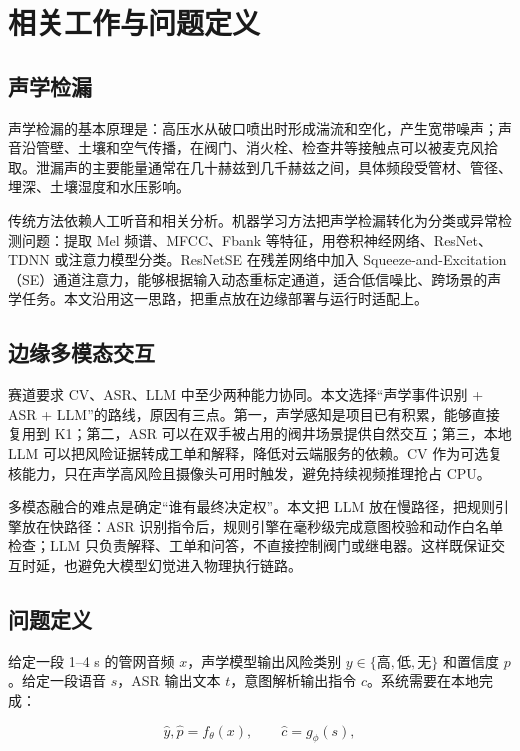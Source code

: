 \documentclass[UTF8,11pt,a4paper,fontset=none]{ctexart}
\begin{document}
\section{相关工作与问题定义}
\label{sec:related}

\subsection{声学检漏}

声学检漏的基本原理是：高压水从破口喷出时形成湍流和空化，产生宽带噪声；声音沿管壁、土壤和空气传播，在阀门、消火栓、检查井等接触点可以被麦克风拾取。泄漏声的主要能量通常在几十赫兹到几千赫兹之间，具体频段受管材、管径、埋深、土壤湿度和水压影响。

传统方法依赖人工听音和相关分析。机器学习方法把声学检漏转化为分类或异常检测问题：提取 Mel 频谱、MFCC、Fbank 等特征，用卷积神经网络、ResNet、TDNN 或注意力模型分类。ResNetSE 在残差网络中加入 Squeeze-and-Excitation（SE）通道注意力\cite{se}，能够根据输入动态重标定通道，适合低信噪比、跨场景的声学任务。本文沿用这一思路，把重点放在边缘部署与运行时适配上。

\subsection{边缘多模态交互}

赛道要求 CV、ASR、LLM 中至少两种能力协同。本文选择“声学事件识别 + ASR + LLM”的路线，原因有三点。第一，声学感知是项目已有积累，能够直接复用到 K1；第二，ASR 可以在双手被占用的阀井场景提供自然交互；第三，本地 LLM 可以把风险证据转成工单和解释，降低对云端服务的依赖。CV 作为可选复核能力，只在声学高风险且摄像头可用时触发，避免持续视频推理抢占 CPU。

多模态融合的难点是确定“谁有最终决定权”。本文把 LLM 放在慢路径，把规则引擎放在快路径：ASR 识别指令后，规则引擎在毫秒级完成意图校验和动作白名单检查；LLM 只负责解释、工单和问答，不直接控制阀门或继电器。这样既保证交互时延，也避免大模型幻觉进入物理执行链路。

\subsection{问题定义}

给定一段 1--4 s 的管网音频 \(x\)，声学模型输出风险类别 \(y\in\{\text{高},\text{低},\text{无}\}\) 和置信度 \(p\)。给定一段语音 \(s\)，ASR 输出文本 \(t\)，意图解析输出指令 \(c\)。系统需要在本地完成：

\begin{equation}
  \hat{y}, \hat{p} = f_{\theta}(x), \qquad
  \hat{c} = g_{\phi}(s),
  \label{eq:problem}
\end{equation}
\end{document}
